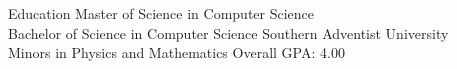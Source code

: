 \begin{rSection}{Education}
	Master of Science in Computer Science \hfill {}\\
	Bachelor of Science in Computer Science \hfill {Southern Adventist University}\\
	Minors in Physics and Mathematics \hfill {Overall GPA: 4.00}
\end{rSection}